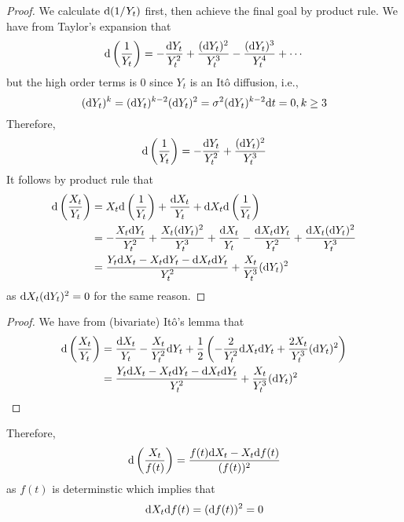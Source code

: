 \documentclass{homework}
\begin{document}
    \problem
    \begin{subproblem}[(\alph*)]
        \item
        \begin{proof}
            We calculate $\mathrm d(1/Y_t)$ first, then achieve the final goal by
            product rule.
            We have from Taylor's expansion that
            \[\mathrm d\left(\frac{1}{Y_t}\right)
            =-\frac{\mathrm d Y_t}{Y_t^2}+\frac{(\mathrm d Y_t)^2}{Y_t^3}
            -\frac{(\mathrm d Y_t)^3}{Y_t^4}+\cdots\]
            but the high order terms is 0 since $Y_t$ is an It\^o diffusion, i.e.,
            \[(\mathrm d Y_t)^k=(\mathrm d Y_t)^{k-2}(\mathrm d Y_t)^2=\sigma^2(\mathrm d Y_t)^{k-2}\mathrm d t=0
            ,k\geq 3\]
            Therefore,
            \[\mathrm d\left(\frac{1}{Y_t}\right)
            =-\frac{\mathrm d Y_t}{Y_t^2}+\frac{(\mathrm d Y_t)^2}{Y_t^3}\]
            It follows by product rule that
            \[\begin{aligned}
                \diff\left(\frac{X_t}{Y_t}\right)
                &=X_t\diff\left(\frac{1}{Y_t}\right)+\frac{\diff X_t}{Y_t}
                +\diff X_t\diff\left(\frac{1}{Y_t}\right)\\
                &=-\frac{X_t\diff Y_t}{Y_t^2}+\frac{X_t(\diff Y_t)^2}{Y_t^3}
                +\frac{\diff X_t}{Y_t}
                -\frac{\diff X_t\diff Y_t}{Y_t^2}
                +\frac{\diff X_t(\diff Y_t)^2}{Y_t^3}\\
                &=\frac{Y_t\diff X_t-X_t\diff Y_t-\diff X_t\diff Y_t}%
                  {Y_t^2}+\frac{X_t}{Y_t^3}(\diff Y_t)^2
            \end{aligned}\]
            as $\mathrm d X_t(\mathrm d Y_t)^2=0$ for the same reason.
        \end{proof}

        \item
        \begin{proof}
            We have from (bivariate) It\^o's lemma that
            \[\begin{aligned}
                \diff\left(\frac{X_t}{Y_t}\right)&=
                \frac{\diff X_t}{Y_t}-\frac{X_t}{Y_t^2}\diff Y_t
                +\frac{1}{2}\left(
                    -\frac{2}{Y_t^2}\diff X_t\diff Y_t
                    +\frac{2X_t}{Y_t^3}(\diff Y_t)^2
                \right)\\
                &=\frac{Y_t\diff X_t-X_t\diff Y_t-\diff X_t\diff Y_t}%
                  {Y_t^2}+\frac{X_t}{Y_t^3}(\diff Y_t)^2
            \end{aligned}\]
        \end{proof}

        Therefore,
        \[\mathrm d\left(\frac{X_t}{f(t)}\right)
        =\frac{f(t)\mathrm d X_t-X_t\mathrm d f(t)}{(f(t))^2}\]
        as $f(t)$ is determinstic which implies that
        \[\mathrm d X_t\mathrm d f(t)=(\mathrm d f(t))^2=0\]
    \end{subproblem}
\end{document}
